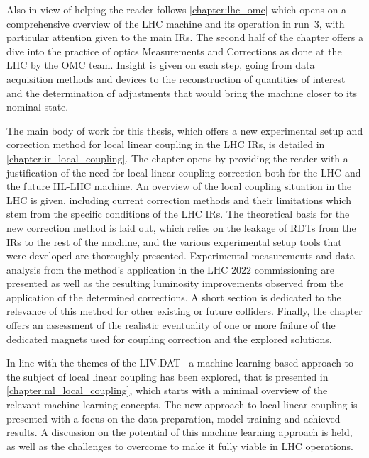 Also in view of helping the reader follows \cref{chapter:lhc_omc} which opens on a comprehensive overview of the \acrshort{LHC} machine and its operation in \Gls{run}~\num{3}, with particular attention given to the main \glspl{IR}.
The second half of the chapter offers a dive into the practice of \Gls{optics} Measurements and Corrections as done at the LHC by the \acrshort{OMC} team.
Insight is given on each step, going from data acquisition methods and devices to the reconstruction of quantities of interest and the determination of adjustments that would bring the machine closer to its nominal state.

The main body of work for this thesis, which offers a new experimental setup and correction method for local linear coupling in the \acrshort{LHC} \glspl{IR}, is detailed in \cref{chapter:ir_local_coupling}.
The chapter opens by providing the reader with a justification of the need for local linear coupling correction both for the \acrshort{LHC} and the future \acrshort{HL-LHC} machine.
An overview of the local coupling situation in the \acrshort{LHC} is given, including current correction methods and their limitations which stem from the specific conditions of the \acrshort{LHC} \glspl{IR}.
The theoretical basis for the new correction method is laid out, which relies on the leakage of \glspl{RDT} from the \glspl{IR} to the rest of the machine, and the various experimental setup tools that were developed are thoroughly presented.
Experimental measurements and data analysis from the method's application in the \acrshort{LHC} \num{2022} commissioning are presented as well as the resulting \gls{luminosity} improvements observed from the application of the determined corrections.
A short section is dedicated to the relevance of this method for other existing or future colliders.
Finally, the chapter offers an assessment of the realistic eventuality of one or more failure of the dedicated magnets used for coupling correction and the explored solutions.

In line with the themes of the \gls{LIV.DAT}~\cite{Website:LIVDAT} a machine learning based approach to the subject of local linear coupling has been explored, that is presented in \cref{chapter:ml_local_coupling}, which starts with a minimal overview of the relevant machine learning concepts.
The new approach to local linear coupling is presented with a focus on the data preparation, model training and achieved results.
A discussion on the potential of this machine learning approach is held, as well as the challenges to overcome to make it fully viable in LHC operations.

